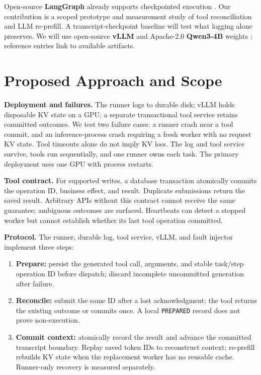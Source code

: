 \documentclass{article}
\begin{document}
Open-source \textbf{LangGraph} already supports checkpointed execution \cite{langgraph}. Our contribution is a scoped prototype and measurement study of tool reconciliation and LLM re-prefill. A transcript-checkpoint baseline will test what logging alone preserves. We will use open-source \textbf{vLLM} and Apache-2.0 \textbf{Qwen3-4B} weights \cite{vllm,qwen3}; reference entries link to available artifacts.

\section{Proposed Approach and Scope}
\textbf{Deployment and failures.} The runner logs to durable disk; vLLM holds disposable KV state on a GPU; a separate transactional tool service retains committed outcomes. We test two failure cases: a runner crash near a tool commit, and an inference-process crash requiring a fresh worker with no request KV state. Tool timeouts alone do not imply KV loss. The log and tool service survive, tools run sequentially, and one runner owns each task. The primary deployment uses one GPU with process restarts.

\textbf{Tool contract.} For supported writes, a database transaction atomically commits the operation ID, business effect, and result. Duplicate submissions return the saved result. Arbitrary APIs without this contract cannot receive the same guarantee; ambiguous outcomes are surfaced. Heartbeats can detect a stopped worker but cannot establish whether its last tool operation committed.

\textbf{Protocol.} The runner, durable log, tool service, vLLM, and fault injector implement three steps:
\begin{enumerate}
\item \textbf{Prepare:} persist the generated tool call, arguments, and stable task/step operation ID before dispatch; discard incomplete uncommitted generation after failure.
\item \textbf{Reconcile:} submit the same ID after a lost acknowledgment; the tool returns the existing outcome or commits once. A local \texttt{PREPARED} record does not prove non-execution.
\item \textbf{Commit context:} atomically record the result and advance the committed transcript boundary. Replay saved token IDs to reconstruct context; re-prefill rebuilds KV state when the replacement worker has no reusable cache. Runner-only recovery is measured separately.
\end{enumerate}
\end{document}
